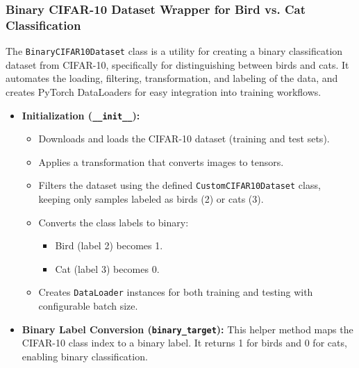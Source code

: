 \subsubsection{Binary CIFAR-10 Dataset Wrapper for Bird vs. Cat Classification}

The \texttt{BinaryCIFAR10Dataset} class is a utility for creating a binary classification dataset from CIFAR-10, specifically for distinguishing between birds and cats. It automates the loading, filtering, transformation, and labeling of the data, and creates PyTorch DataLoaders for easy integration into training workflows.

\begin{itemize}
    \item \textbf{Initialization (\texttt{\_\_init\_\_}):} 
    \begin{itemize}
        \item Downloads and loads the CIFAR-10 dataset (training and test sets).
        \item Applies a transformation that converts images to tensors.
        \item Filters the dataset using the defined \texttt{CustomCIFAR10Dataset} class, keeping only samples labeled as birds (2) or cats (3).
        \item Converts the class labels to binary:
              \begin{itemize}
                  \item Bird (label 2) becomes 1.
                  \item Cat (label 3) becomes 0.
              \end{itemize}
        \item Creates \texttt{DataLoader} instances for both training and testing with configurable batch size.
    \end{itemize}
    
    \item \textbf{Binary Label Conversion (\texttt{binary\_target}):}  
    This helper method maps the CIFAR-10 class index to a binary label. It returns 1 for birds and 0 for cats, enabling binary classification.
\end{itemize}
